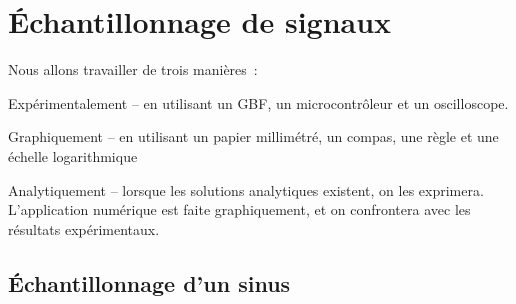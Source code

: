 \documentclass[a4paper,twoside,12pt]{report}           %
\newcommand{\exintro}[0]{\upshape\rmfamily}
\begin{document}



\chapter{Échantillonnage de signaux}


Nous allons travailler de trois manières~:
\begin{description}
\item Expérimentalement -- en utilisant un GBF, un microcontrôleur et
  un oscilloscope.
\item Graphiquement -- en utilisant un papier millimétré, un compas,
  une règle et une échelle logarithmique
\item Analytiquement -- lorsque les solutions analytiques existent, on
  les exprimera. L'application numérique est faite graphiquement, et
  on confrontera avec les résultats expérimentaux.
\end{description}


\section{Échantillonnage d'un sinus}
\exintro{}
\label{part:echantillonnage}
\end{document}
